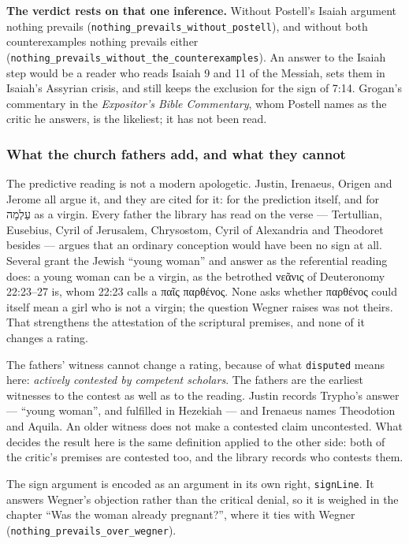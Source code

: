 \documentclass[11pt]{article}
\begin{document}
\textbf{The verdict rests on that one inference.} Without Postell’s Isaiah argument nothing prevails (\texttt{nothing\_\allowbreak{}prevails\_\allowbreak{}without\_\allowbreak{}postell}), and without both counterexamples nothing prevails either (\texttt{nothing\_\allowbreak{}prevails\_\allowbreak{}without\_\allowbreak{}the\_\allowbreak{}counterexamples}). An answer to the Isaiah step would be a reader who reads Isaiah 9 and 11 of the Messiah, sets them in Isaiah’s Assyrian crisis, and still keeps the exclusion for the sign of 7:14. Grogan’s commentary in the \emph{Expositor’s Bible Commentary}, whom Postell names as the critic he answers, is the likeliest; it has not been read.

\subsubsection*{What the church fathers add, and what they cannot}
The predictive reading is not a modern apologetic. Justin, Irenaeus, Origen and Jerome all argue it, and they are cited for it: for the prediction itself, and for עַלְמָה as a virgin. Every father the library has read on the verse — Tertullian, Eusebius, Cyril of Jerusalem, Chrysostom, Cyril of Alexandria and Theodoret besides — argues that an ordinary conception would have been no sign at all. Several grant the Jewish “young woman” and answer as the referential reading does: a young woman can be a virgin, as the betrothed νεᾶνις of Deuteronomy 22:23–27 is, whom 22:23 calls a παῖς παρθένος. None asks whether παρθένος could itself mean a girl who is not a virgin; the question Wegner raises was not theirs. That strengthens the attestation of the scriptural premises, and none of it changes a rating.

The fathers’ witness cannot change a rating, because of what \texttt{disputed} means here: \emph{actively contested by competent scholars}. The fathers are the earliest witnesses to the contest as well as to the reading. Justin records Trypho’s answer — “young woman”, and fulfilled in Hezekiah — and Irenaeus names Theodotion and Aquila. An older witness does not make a contested claim uncontested. What decides the result here is the same definition applied to the other side: both of the critic’s premises are contested too, and the library records who contests them.

The sign argument is encoded as an argument in its own right, \texttt{sign\allowbreak{}Line}. It answers Wegner’s objection rather than the critical denial, so it is weighed in the chapter “Was the woman already pregnant?”, where it ties with Wegner (\texttt{nothing\_\allowbreak{}prevails\_\allowbreak{}over\_\allowbreak{}wegner}).
\end{document}
